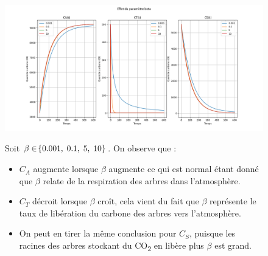 \documentclass[12pt]{article}
\theoremstyle{saav}
\newcommand{\acc}[1]{\hspace{-0.05cm}\left\{#1 \right\}}
\begin{document}
	\begin{figure}[htbp]
	\centering
	\begin{minipage}[h]{0.9\linewidth}
		\centering
		\includegraphics[width=\linewidth]{images/beta_var.png}
		\par\vspace{0.5em}
		
		
		Soit $\beta \in \acc{0.001,\hspace{1mm} 0.1,\hspace{1mm} 5,\hspace{1mm} 10}$.
		On observe que :
		\begin{itemize}[label*=\textbullet]
			\item $C_{A}$ augmente lorsque $\beta$ augmente ce qui est normal étant donné que $\beta$ relate de la respiration des arbres dans l'atmosphère. 
			\item $C_{T}$ décroit lorsque $\beta$ croît, cela vient du fait que $\beta$ représente le taux de libération du carbone des arbres vers l'atmosphère.
			\item On peut en tirer la même conclusion pour $C_{S}$, puisque les racines des arbres stockant du CO\textsubscript{2} en libère plus $\beta$ est grand.
		\end{itemize}
	\end{minipage}
	
	\end{figure}
	
\end{document}

